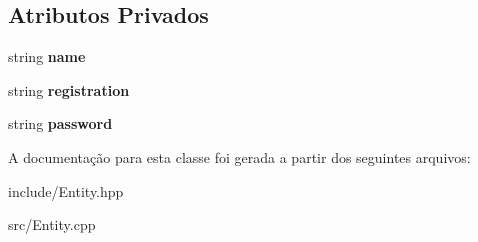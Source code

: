 \subsection*{Atributos Privados}
\begin{DoxyCompactItemize}
\item 
string {\bfseries name}\hypertarget{classSysManager_a32c5ef10d2a932e9476cb508d85f9ef9}{}\label{classSysManager_a32c5ef10d2a932e9476cb508d85f9ef9}

\item 
string {\bfseries registration}\hypertarget{classSysManager_a336417d9d702b18764898dca0622f04d}{}\label{classSysManager_a336417d9d702b18764898dca0622f04d}

\item 
string {\bfseries password}\hypertarget{classSysManager_a3c07b541cccc3baa013011dc1240fff7}{}\label{classSysManager_a3c07b541cccc3baa013011dc1240fff7}

\end{DoxyCompactItemize}


A documentação para esta classe foi gerada a partir dos seguintes arquivos\+:\begin{DoxyCompactItemize}
\item 
include/Entity.\+hpp\item 
src/Entity.\+cpp\end{DoxyCompactItemize}
